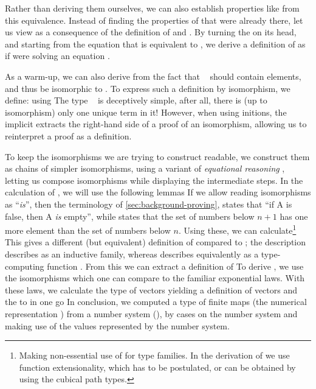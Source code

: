 Rather than deriving them ourselves, we can also establish properties like  from this equivalence. Instead of finding the properties of  that were already there, let us view  as a consequence of the definition of \bN{} and . By turning the  on its head, and starting from the equation that  is equivalent to , we derive a definition of  as if were solving an equation \cite{calcdata}.

As a warm-up, we can also derive  from the fact that \  should contain  elements, and thus be isomorphic to . To express such a definition by isomorphism, we define:
using
The type \  is deceptively simple, after all, there is (up to isomorphism) only one unique term in it! However, when using initions, the implicit  extracts the right-hand side of a proof of an isomorphism, allowing us to reinterpret a proof as a definition.

To keep the isomorphisms we are trying to construct readable, we construct them as chains of simpler isomorphisms, using a variant of \emph{equational reasoning} \cite{agdastdlib, plfa}, letting us compose isomorphisms while displaying the intermediate steps. In the calculation of , we will use the following lemmas
If we allow reading isomorphisms as ``\emph{is}'', then the terminology of \autoref{sec:background-proving},  states that ``if A is false, then A \emph{is} empty'', while  states that the set of numbers below $n+1$ has one more element than the set of numbers below $n$. Using these, we can calculate\footnote{Making non-essential use of  for type families. In the derivation of  we use function extensionality, which has to be postulated, or can be obtained by using the cubical path types.}
This gives a different (but equivalent) definition of  compared to ; the description  describes  as an inductive family, whereas  describes  equivalently as a type-computing function \cite{progorn}. From this  we can extract a definition of 
To derive , we use the isomorphisms
which one can compare to the familiar exponential laws. With these laws, we calculate the type of vectors
yielding a definition of vectors and the  to  in one go
In conclusion, we computed a type of finite maps (the numerical representation ) from a number system (\bN{}), by cases on the number system and making use of the values represented by the number system.


